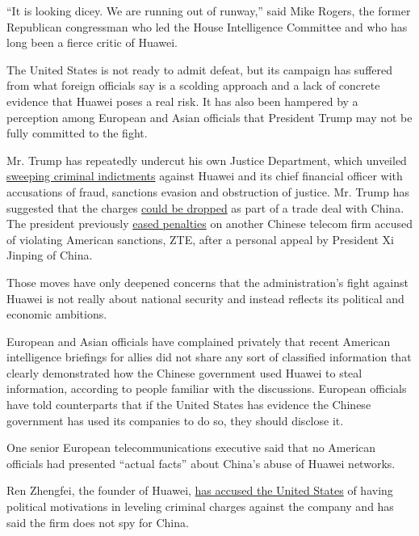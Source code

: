 ``It is looking dicey. We are running out of runway,'' said Mike Rogers,
the former Republican congressman who led the House Intelligence
Committee and who has long been a fierce critic of Huawei.

The United States is not ready to admit defeat, but its campaign has
suffered from what foreign officials say is a scolding approach and a
lack of concrete evidence that Huawei poses a real risk. It has also
been hampered by a perception among European and Asian officials that
President Trump may not be fully committed to the fight.

Mr. Trump has repeatedly undercut his own Justice Department, which
unveiled
\href{https://www.nytimes.com/2019/01/28/us/politics/meng-wanzhou-huawei-iran.html}{sweeping
criminal indictments} against Huawei and its chief financial officer
with accusations of fraud, sanctions evasion and obstruction of justice.
Mr. Trump has suggested that the charges
\href{https://www.nytimes.com/2019/02/22/business/economy/china-usa-trade.html}{could
be dropped} as part of a trade deal with China. The president previously
\href{https://www.nytimes.com/2018/07/13/business/zte-ban-trump.html}{eased
penalties} on another Chinese telecom firm accused of violating American
sanctions, ZTE, after a personal appeal by President Xi Jinping of
China.

Those moves have only deepened concerns that the administration's fight
against Huawei is not really about national security and instead
reflects its political and economic ambitions.

European and Asian officials have complained privately that recent
American intelligence briefings for allies did not share any sort of
classified information that clearly demonstrated how the Chinese
government used Huawei to steal information, according to people
familiar with the discussions. European officials have told counterparts
that if the United States has evidence the Chinese government has used
its companies to do so, they should disclose it.

One senior European telecommunications executive said that no American
officials had presented ``actual facts'' about China's abuse of Huawei
networks.

Ren Zhengfei, the founder of Huawei,
\href{https://www.nytimes.com/2019/02/18/technology/huawei-ren-zhengfei-bbc.html}{has
accused the United States} of having political motivations in leveling
criminal charges against the company and has said the firm does not spy
for China.


